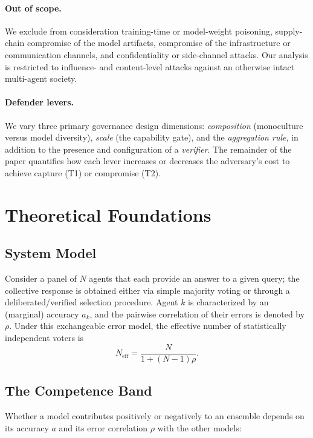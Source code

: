 \documentclass[manuscript,screen,review]{acmart}
\begin{document}
\paragraph{Out of scope.} We exclude from consideration training-time or model-weight
poisoning, supply-chain compromise of the model artifacts, compromise of the
infrastructure or communication channels, and confidentiality or side-channel attacks. Our
analysis is restricted to influence- and content-level attacks against an otherwise intact
multi-agent society.

\paragraph{Defender levers.} We vary three primary governance design dimensions:
\emph{composition} (monoculture versus model diversity), \emph{scale} (the capability gate),
and the \emph{aggregation rule}, in addition to the presence and configuration of a
\emph{verifier}. The remainder of the paper quantifies how each lever increases or
decreases the adversary's cost to achieve capture (T1) or compromise (T2).

\section{Theoretical Foundations}
\subsection{System Model}
Consider a panel of $N$ agents that each provide an answer to a given query; the collective response is obtained either via simple majority voting or through a deliberated/verified selection procedure. Agent $k$ is characterized by an (marginal) accuracy $a_k$, and the pairwise correlation of their errors is denoted by $\rho$. Under this exchangeable error model, the effective number of statistically independent voters is
\begin{equation}
N_{\mathrm{eff}} = \frac{N}{1 + (N - 1)\rho}.
\end{equation}

\subsection{The Competence Band}
Whether a model contributes positively or negatively to an ensemble depends on its accuracy $a$ and its error correlation $\rho$ with the other models:
\end{document}
